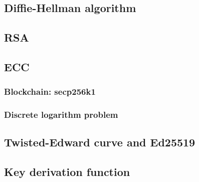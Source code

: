 \subsection{Diffie-Hellman algorithm}

\subsection{RSA}

\subsection{ECC}

\subsubsection{Blockchain: secp256k1}

\subsubsection{Discrete logarithm problem}

\subsection{Twisted-Edward curve and Ed25519}

\subsection{Key derivation function}




    
